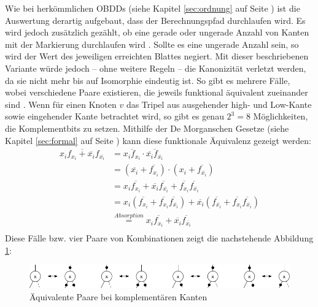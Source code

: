 Wie bei herkömmlichen OBDDs (siehe Kapitel \ref{sec:ordnung} auf Seite \pageref{sec:ordnung}) ist die Auswertung derartig aufgebaut, dass der Berechnungspfad durchlaufen wird. Es wird jedoch zusätzlich gezählt, ob eine gerade oder ungerade Anzahl von Kanten mit der Markierung durchlaufen wird \cite[S.42-44]{h2002}. Sollte es eine ungerade Anzahl sein, so wird der Wert des jeweiligen erreichten Blattes negiert. Mit dieser beschriebenen Variante würde jedoch -- ohne weitere Regeln -- die Kanonizität verletzt werden, da sie nicht mehr bis auf Isomorphie eindeutig ist. So gibt es mehrere Fälle, wobei verschiedene Paare existieren, die jeweils funktional äquivalent zueinander sind \cite[S.119-121]{mt1998}. Wenn für einen Knoten $v$ das Tripel aus ausgehender high- und Low-Kante sowie eingehender Kante betrachtet wird, so gibt es genau $2^3 = 8$ Möglichkeiten, die Komplementbits zu setzen. Mithilfe der De Morganschen Gesetze (siehe Kapitel \ref{sec:formal} auf Seite \pageref{sec:formal}) kann diese funktionale Äquivalenz gezeigt werden:
\begin{equation*}
\begin{split}
\overline{x_if_{x_i} + \overline{x_i}f_{\overline{x_i}}} &= \overline{x_if_{x_i}} \cdot \overline{\overline{x_i}f_{\overline{x_i}}}\\
&= (\overline{x_i} + \overline{f_{x_i}}) \cdot (x_i + \overline{f_{\overline{x_i}}})\\
&= x_i\overline{f_{x_i}} + \overline{x_i}\overline{f_{\overline{x_i}}} + \overline{f_{x_i}}\overline{f_{\overline{x_i}}}\\
&= x_i(\overline{f_{x_i}} + \overline{f_{x_i}}\overline{f_{\overline{x_i}}}) + \overline{x_i}(\overline{f_{\overline{x_i}}} + \overline{f_{x_i}}\overline{f_{\overline{x_i}}})\\
&\overset{Absorption}{=} x_i\overline{f_{x_i}} + \overline{x_i}\overline{f_{\overline{x_i}}}\\
\end{split}
\end{equation*}
Diese Fälle bzw. vier Paare von Kombinationen zeigt die nachstehende Abbildung \ref{fig:complement}:
\begin{figure}[bth]
	\centering
	\includegraphics[scale=0.5]{./img/complement}
	\caption[Äquivalente Paare bei komplementären Kanten]{Äquivalente Paare bei komplementären Kanten}
	\label{fig:complement}
\end{figure}\\
